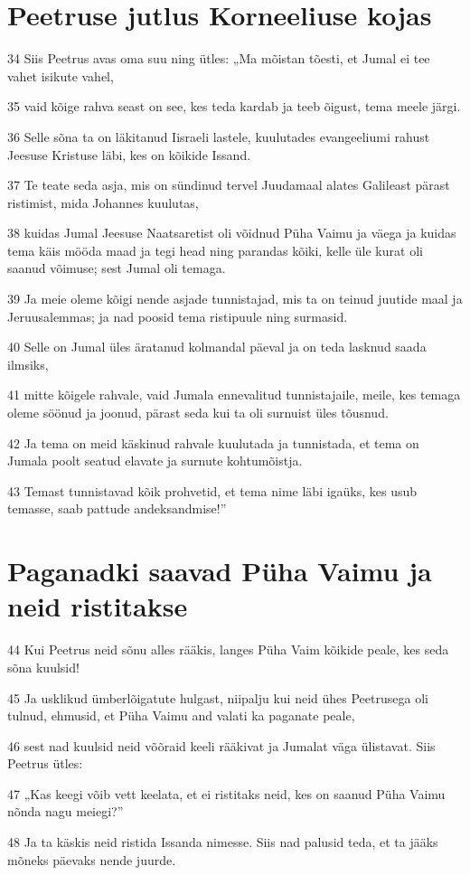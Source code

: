 \section*{Peetruse jutlus Korneeliuse kojas}

\par 34 Siis Peetrus avas oma suu ning ütles: „Ma mõistan tõesti, et Jumal ei tee vahet isikute vahel,
\par 35 vaid kõige rahva seast on see, kes teda kardab ja teeb õigust, tema meele järgi.
\par 36 Selle sõna ta on läkitanud Iisraeli lastele, kuulutades evangeeliumi rahust Jeesuse Kristuse läbi, kes on kõikide Issand.
\par 37 Te teate seda asja, mis on sündinud tervel Juudamaal alates Galileast pärast ristimist, mida Johannes kuulutas,
\par 38 kuidas Jumal Jeesuse Naatsaretist oli võidnud Püha Vaimu ja väega ja kuidas tema käis mööda maad ja tegi head ning parandas kõiki, kelle üle kurat oli saanud võimuse; sest Jumal oli temaga.
\par 39 Ja meie oleme kõigi nende asjade tunnistajad, mis ta on teinud juutide maal ja Jeruusalemmas; ja nad poosid tema ristipuule ning surmasid.
\par 40 Selle on Jumal üles äratanud kolmandal päeval ja on teda lasknud saada ilmsiks,
\par 41 mitte kõigele rahvale, vaid Jumala ennevalitud tunnistajaile, meile, kes temaga oleme söönud ja joonud, pärast seda kui ta oli surnuist üles tõusnud.
\par 42 Ja tema on meid käskinud rahvale kuulutada ja tunnistada, et tema on Jumala poolt seatud elavate ja surnute kohtumõistja.
\par 43 Temast tunnistavad kõik prohvetid, et tema nime läbi igaüks, kes usub temasse, saab pattude andeksandmise!”

\section*{Paganadki saavad Püha Vaimu ja neid ristitakse}

\par 44 Kui Peetrus neid sõnu alles rääkis, langes Püha Vaim kõikide peale, kes seda sõna kuulsid!
\par 45 Ja usklikud ümberlõigatute hulgast, niipalju kui neid ühes Peetrusega oli tulnud, ehmusid, et Püha Vaimu and valati ka paganate peale,
\par 46 sest nad kuulsid neid võõraid keeli rääkivat ja Jumalat väga ülistavat. Siis Peetrus ütles:
\par 47 „Kas keegi võib vett keelata, et ei ristitaks neid, kes on saanud Püha Vaimu nõnda nagu meiegi?”
\par 48 Ja ta käskis neid ristida Issanda nimesse. Siis nad palusid teda, et ta jääks mõneks päevaks nende juurde.


